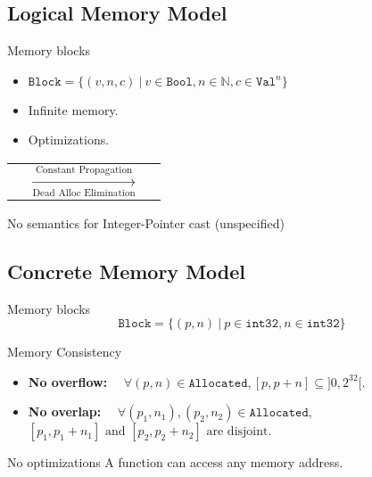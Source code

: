 \subsection{Logical Memory Model}
\begin{frame}{\subsecname}

  \begin{block}{Memory blocks}
    \begin{itemize}
    \item $\texttt{Block}=\{(v,n,c)~|~v\in\texttt{Bool},n\in\mathbb{N},c\in\texttt{Val}^{n}\}$
    \item Infinite memory.
    \item Optimizations.
    \end{itemize}
  \end{block}
  \vfill
  \begin{center}
    \begin{tabular}{l c r}
       &
      $\xrightarrow[\text{Dead Alloc Elimination}]{\text{Constant Propagation}}$ &
      
    \end{tabular}
  \end{center}
  \vfill
  \begin{alertblock}{No semantics for Integer-Pointer cast (unspecified)}
  \end{alertblock}
  
\end{frame}

\subsection{Concrete Memory Model}
\begin{frame}{\subsecname}

  \begin{block}{Memory blocks}
    $$\texttt{Block}=\{(p,n)~|~p\in\texttt{int32},n\in\texttt{int32}\}$$
  \end{block}
  \vfill
  \begin{block}{Memory Consistency}
    \begin{itemize}
    \item \textbf{No overflow:} $\quad\forall (p,n)\in\texttt{Allocated}, [p,p+n]\subseteq]0,2^{32}[$.
      \item \textbf{No overlap:} $\quad\forall (p_1,n_1), (p_2,n_2)\in\texttt{Allocated},$\\ $[p_1,p_1+n_1]\text{ and }[p_2,p_2+n_2]\text{ are disjoint.}$
    \end{itemize}
  \end{block}
  \vfill
  \begin{alertblock}{No optimizations}
    A function can access any memory address.
  \end{alertblock}

\end{frame}

